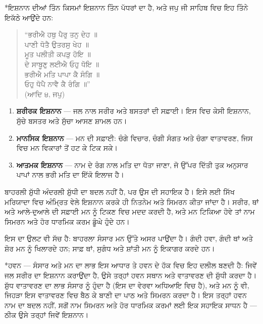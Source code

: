 \documentclass[12pt,a5paper,twoside]{book}  %
\makeatletter
\renewcommand\section{\@startsection{section}{1}{0pt}{1.2em}{0.6em}{\punjabifont\Large\bfseries}}%
\DeclareRobustCommand{\eng}[1]{{\rmfamily #1}}
\makeatother
\begin{document}
{\section*{ਇਸ਼ਨਾਨ ਦੀਆਂ ਤਿੰਨ ਕਿਸਮਾਂ}
ਇਸ਼ਨਾਨ ਤਿੰਨ ਪੱਧਰਾਂ ਦਾ ਹੈ, ਅਤੇ ਜਪੁ ਜੀ ਸਾਹਿਬ ਵਿਚ ਇਹ ਤਿੰਨੇ ਇਕੱਠੇ ਆਉਂਦੇ ਹਨ:
\begin{quote}
“ਭਰੀਐ ਹਥੁ ਪੈਰੁ ਤਨੁ ਦੇਹ ॥ \\
ਪਾਣੀ ਧੋਤੈ ਉਤਰਸੁ ਖੇਹ ॥ \\
ਮੂਤ ਪਲੀਤੀ ਕਪੜੁ ਹੋਇ ॥ \\
ਦੇ ਸਾਬੂਣੁ ਲਈਐ ਓਹੁ ਧੋਇ ॥ \\
ਭਰੀਐ ਮਤਿ ਪਾਪਾ ਕੈ ਸੰਗਿ ॥ \\
ਓਹੁ ਧੋਪੈ ਨਾਵੈ ਕੈ ਰੰਗਿ ॥” \\
(ਆਦਿ ੪, ਜਪੁ)
\end{quote}
\begin{enumerate}[label=(\arabic*)]
    \item \textbf{ਸ਼ਰੀਰਕ ਇਸ਼ਨਾਨ} — ਜਲ ਨਾਲ ਸਰੀਰ ਅਤੇ ਬਸਤਰਾਂ ਦੀ ਸਫ਼ਾਈ। ਇਸ ਵਿਚ ਕੇਸੀ ਇਸ਼ਨਾਨ, ਸੁੱਚੇ ਬਸਤਰ ਅਤੇ ਸੁੱਚਾ ਆਸਣ ਸ਼ਾਮਲ ਹਨ।
    \item \textbf{ਮਾਨਸਿਕ ਇਸ਼ਨਾਨ} — ਮਨ ਦੀ ਸਫ਼ਾਈ: ਚੰਗੇ ਵਿਚਾਰ, ਚੰਗੀ ਸੰਗਤ ਅਤੇ ਚੰਗਾ ਵਾਤਾਵਰਣ, ਜਿਸ ਵਿਚ ਮਨ ਵਿਕਾਰਾਂ ਤੋਂ ਹਟ ਕੇ ਟਿਕ ਸਕੇ।
    \item \textbf{ਆਤਮਕ ਇਸ਼ਨਾਨ} — ਨਾਮ ਦੇ ਰੰਗ ਨਾਲ ਮਤਿ ਦਾ ਧੋਤਾ ਜਾਣਾ, ਜੋ ਉੱਪਰ ਦਿੱਤੀ ਤੁਕ ਅਨੁਸਾਰ ਪਾਪਾਂ ਨਾਲ ਭਰੀ ਮਤਿ ਦਾ ਇੱਕੋ ਇਲਾਜ ਹੈ।
\end{enumerate}
ਬਾਹਰਲੀ ਸ਼ੁੱਧੀ ਅੰਦਰਲੀ ਸ਼ੁੱਧੀ ਦਾ ਬਦਲ ਨਹੀਂ ਹੈ, ਪਰ ਉਸ ਦੀ ਸਹਾਇਕ ਹੈ। ਇਸੇ ਲਈ ਸਿੱਖ ਮਰਿਯਾਦਾ ਵਿਚ ਅੰਮ੍ਰਿਤ ਵੇਲੇ ਇਸ਼ਨਾਨ ਕਰਕੇ ਹੀ ਨਿਤਨੇਮ ਅਤੇ ਸਿਮਰਨ ਕੀਤਾ ਜਾਂਦਾ ਹੈ। ਸਰੀਰ, ਥਾਂ ਅਤੇ ਆਲੇ-ਦੁਆਲੇ ਦੀ ਸਫ਼ਾਈ ਮਨ ਨੂੰ ਟਿਕਣ ਵਿਚ ਮਦਦ ਕਰਦੀ ਹੈ, ਅਤੇ ਮਨ ਟਿਕਿਆ ਹੋਵੇ ਤਾਂ ਨਾਮ ਸਿਮਰਨ ਅਤੇ ਹੋਰ ਧਾਰਮਿਕ ਕਰਮ ਡੂੰਘੇ ਹੁੰਦੇ ਹਨ।

ਇਸ ਦਾ ਉਲਟ ਵੀ ਸੱਚ ਹੈ: ਬਾਹਰਲਾ ਸੰਸਾਰ ਮਨ ਉੱਤੇ ਅਸਰ ਪਾਉਂਦਾ ਹੈ। ਗੰਦੀ ਹਵਾ, ਗੰਦੀ ਥਾਂ ਅਤੇ ਸ਼ੋਰ ਮਨ ਨੂੰ ਖਿਲਾਰਦੇ ਹਨ; ਸਾਫ਼ ਥਾਂ, ਸੁਗੰਧ ਅਤੇ ਸ਼ਾਂਤੀ ਮਨ ਨੂੰ ਇਕਾਗਰ ਕਰਦੇ ਹਨ।

\section*{ਹਵਨ — ਸੰਸਾਰ ਅਤੇ ਮਨ ਦਾ ਲਾਭ}
ਇਸ ਆਧਾਰ ਤੇ ਹਵਨ ਦੇ ਹੱਕ ਵਿਚ ਇਹ ਦਲੀਲ ਬਣਦੀ ਹੈ: ਜਿਵੇਂ ਜਲ ਸਰੀਰ ਦਾ ਇਸ਼ਨਾਨ ਕਰਾਉਂਦਾ ਹੈ, ਉਸੇ ਤਰ੍ਹਾਂ ਹਵਨ ਸਥਾਨ ਅਤੇ ਵਾਤਾਵਰਣ ਦੀ ਸ਼ੁੱਧੀ ਕਰਦਾ ਹੈ। ਸ਼ੁੱਧ ਵਾਤਾਵਰਣ ਦਾ ਲਾਭ ਸੰਸਾਰ ਨੂੰ ਹੁੰਦਾ ਹੈ (ਇਸ ਦਾ ਵੇਰਵਾ ਅਧਿਆਇ \eng{11} ਵਿਚ ਹੈ), ਅਤੇ ਮਨ ਨੂੰ ਵੀ, ਜਿਹੜਾ ਇਸ ਵਾਤਾਵਰਣ ਵਿਚ ਬੈਠ ਕੇ ਬਾਣੀ ਦਾ ਪਾਠ ਅਤੇ ਸਿਮਰਨ ਕਰਦਾ ਹੈ। ਇਸ ਤਰ੍ਹਾਂ ਹਵਨ ਨਾਮ ਦਾ ਬਦਲ ਨਹੀਂ, ਸਗੋਂ ਨਾਮ ਸਿਮਰਨ ਅਤੇ ਹੋਰ ਧਾਰਮਿਕ ਕਰਮਾਂ ਲਈ ਇਕ ਸਹਾਇਕ ਸਾਧਨ ਹੈ — ਠੀਕ ਉਸੇ ਤਰ੍ਹਾਂ ਜਿਵੇਂ ਇਸ਼ਨਾਨ।

\clearpage
}
\end{document}
